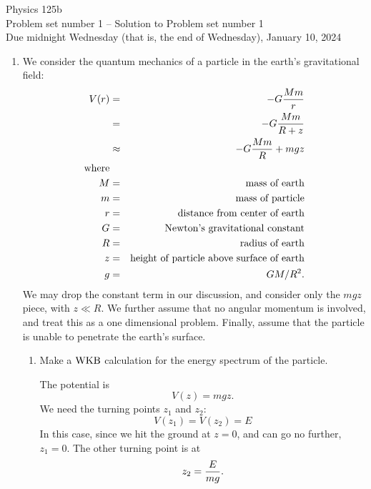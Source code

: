 \solvetrue

\begin{center}
Physics 125b\\
Problem set number 1 \ifsolve -- Solution to Problem set number 1\fi\\
Due midnight Wednesday (that is, the end of Wednesday), January 10, 2024
\end{center}
\medskip


\ifsolve{}\fi


\begin{enumerate} 
 \setcounter{enumi}{0}


\item
\label{prob:WKBgravity}
We consider the quantum mechanics of a particle in the earth's
gravitational field:
\begin{eqnarray}
V(r)&=& -G{Mm\over r}\\
&=& -G{Mm\over R+z}\\
&\approx& -G{Mm\over R}+mgz\\
 \hbox{\rm where}&&\nonumber\\
M&=&{\hbox{\rm mass of earth}}\\
m&=&{\hbox{\rm mass of particle}}\\
r&=&{\hbox{\rm distance from center of earth}}\\
G&=&{\hbox{\rm Newton's gravitational constant}}\\
R&=&{\hbox{\rm radius of earth}}\\
z&=&{\hbox{\rm height of particle above surface of earth}}\\
g&=&GM/R^{2}.
\end{eqnarray}
We may drop the constant term in our discussion, and consider only the $mgz$
piece, with $z\ll R$.  We further assume  
that no angular momentum is involved, and treat this
as a one dimensional problem.  Finally, assume that the particle is unable to
penetrate the earth's surface.
\begin{enumerate}
\item Make a ${\rm WKB}$ calculation for the energy spectrum 
of the particle.

\ifsolve {} The potential is
\begin{equation}
 V(z) = mgz.
\end{equation}
We need the turning points $z_1$ and $z_2$:
\begin{equation}
 V(z_1) = V(z_2) = E
\end{equation}
In this case, since we hit the ground at $z=0$, and can go no further, $z_1=0$. The other turning point is at
\begin{equation}
 z_2 = {E\over mg}.
\end{equation}


\end{enumerate}
\end{enumerate}
